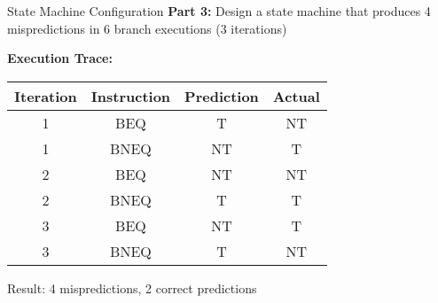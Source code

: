 \documentclass[aspectratio=169,12pt]{beamer}
\begin{document}
\begin{frame}{State Machine Configuration}
\textbf{Part 3:} Design a state machine that produces 4 mispredictions in 6 branch executions (3 iterations)

\begin{center}
\end{center}

\textbf{Execution Trace:}
\begin{table}
\centering
\small
\begin{tabular}{|c|c|c|c|}
\hline
\textbf{Iteration} & \textbf{Instruction} & \textbf{Prediction} & \textbf{Actual} \\
\hline
1 & BEQ & T & NT \\
1 & BNEQ & NT & T \\
2 & BEQ & NT & NT \\
2 & BNEQ & T & T \\
3 & BEQ & NT & T \\
3 & BNEQ & T & NT \\
\hline
\end{tabular}
\end{table}

Result: 4 mispredictions, 2 correct predictions
\end{frame}
\end{document}

